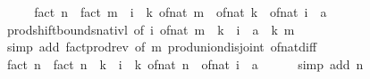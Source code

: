 \begin{isabellebody}
\ \ \isamarkupfalse%
\ \isamarkupfalse%
\ {\isachardoublequoteopen}fact\ n\ {\isacharequal}{\kern0pt}\ {\isacharparenleft}{\kern0pt}fact\ m\ {\isacharasterisk}{\kern0pt}\ {\isacharparenleft}{\kern0pt}{\isasymProd}i\ {\isacharequal}{\kern0pt}\ {}{\isachardot}{\kern0pt}{\isachardot}{\kern0pt}{\isacharless}{\kern0pt}k{\isachardot}{\kern0pt}\ of{\isacharunderscore}{\kern0pt}nat\ m\ {\isacharplus}{\kern0pt}\ of{\isacharunderscore}{\kern0pt}nat\ k\ {\isacharminus}{\kern0pt}\ of{\isacharunderscore}{\kern0pt}nat\ i{\isacharparenright}{\kern0pt}\ {\isacharcolon}{\kern0pt}{\isacharcolon}{\kern0pt}\ {\isacharprime}{\kern0pt}a{\isacharparenright}{\kern0pt}{\isachardoublequoteclose}\isanewline
\ \ \ \ \isamarkupfalse%
\ prod{\isachardot}{\kern0pt}shift{\isacharunderscore}{\kern0pt}bounds{\isacharunderscore}{\kern0pt}nat{\isacharunderscore}{\kern0pt}ivl\ {\isacharbrackleft}{\kern0pt}of\ {\isachardoublequoteopen}{\isasymlambda}i{\isachardot}{\kern0pt}\ of{\isacharunderscore}{\kern0pt}nat\ {\isacharparenleft}{\kern0pt}m\ {\isacharplus}{\kern0pt}\ k\ {\isacharminus}{\kern0pt}\ i{\isacharparenright}{\kern0pt}\ {\isacharcolon}{\kern0pt}{\isacharcolon}{\kern0pt}\ {\isacharprime}{\kern0pt}a{\isachardoublequoteclose}\ {}\ k\ m{\isacharbrackright}{\kern0pt}\isanewline
\ \ \ \ \isamarkupfalse%
\ {\isacharparenleft}{\kern0pt}simp\ add{\isacharcolon}{\kern0pt}\ fact{\isacharunderscore}{\kern0pt}prod{\isacharunderscore}{\kern0pt}rev\ {\isacharbrackleft}{\kern0pt}of\ m{\isacharbrackright}{\kern0pt}\ prod{\isachardot}{\kern0pt}union{\isacharunderscore}{\kern0pt}disjoint\ of{\isacharunderscore}{\kern0pt}nat{\isacharunderscore}{\kern0pt}diff{\isacharparenright}{\kern0pt}\isanewline
\ \ \isamarkupfalse%
\ \isamarkupfalse%
\ {\isachardoublequoteopen}fact\ n\ {\isacharslash}{\kern0pt}\ fact\ {\isacharparenleft}{\kern0pt}n\ {\isacharminus}{\kern0pt}\ k{\isacharparenright}{\kern0pt}\ {\isacharequal}{\kern0pt}\ {\isacharparenleft}{\kern0pt}{\isacharparenleft}{\kern0pt}{\isasymProd}i\ {\isacharequal}{\kern0pt}\ {}{\isachardot}{\kern0pt}{\isachardot}{\kern0pt}{\isacharless}{\kern0pt}k{\isachardot}{\kern0pt}\ of{\isacharunderscore}{\kern0pt}nat\ n\ {\isacharminus}{\kern0pt}\ of{\isacharunderscore}{\kern0pt}nat\ i{\isacharparenright}{\kern0pt}\ {\isacharcolon}{\kern0pt}{\isacharcolon}{\kern0pt}\ {\isacharprime}{\kern0pt}a{\isacharparenright}{\kern0pt}{\isachardoublequoteclose}\isanewline
\ \ \ \ \isamarkupfalse%
\ {\isacharparenleft}{\kern0pt}simp\ add{\isacharcolon}{\kern0pt}\ n{\isacharparenright}{\kern0pt}\isanewline

\end{isabellebody}
